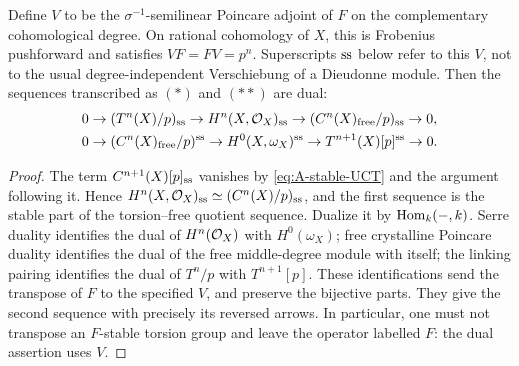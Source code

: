 \begin{proposition}\label{prop:A-star-dual}
 Define $V$ to be
the $\sigma^{-1}$-semilinear Poincare adjoint of $F$ on the
complementary cohomological degree.  On rational cohomology of $X$,
this is Frobenius pushforward and satisfies $VF=FV=p^n$.
Superscripts ${\ss}$ below refer to this $V$, not to the usual
degree-independent Verschiebung of a Dieudonne module.  Then the
sequences transcribed as $(*)$ and $(**)$ are dual:
\begin{align*}
0&\to(T^n(X)/p)_{\ss}\to H^n(X,\OO_X)_{\ss}
 \to(C^n(X)_{\rm free}/p)_{\ss}\to0,\\
0&\to(C^n(X)_{\rm free}/p)^{\ss}\to
 H^0(X,\omega_X)^{\ss}\to T^{n+1}(X)[p]^{\ss}\to0.
\end{align*}
\end{proposition}
\begin{proof}
The term $C^{n+1}(X)[p]_{\ss}$ vanishes by
\eqref{eq:A-stable-UCT} and the argument following it.  Hence
$H^n(X,\OO_X)_{\ss}\simeq(C^n(X)/p)_{\ss}$, and the first sequence
is the stable part of the torsion--free quotient sequence.
Dualize it by $\Hom_k(-,k)$.  Serre duality identifies the dual of
$H^n(\OO_X)$ with $H^0(\omega_X)$; free crystalline Poincare duality
identifies the dual of the free middle-degree module with itself;
the linking pairing identifies the dual of $T^n/p$ with
$T^{n+1}[p]$.  These identifications send the transpose of $F$ to
the specified $V$, and preserve the bijective parts.  They give the
second sequence with precisely its reversed arrows.  In particular,
one must not transpose an $F$-stable torsion group and leave the
operator labelled $F$: the dual assertion uses $V$.
\end{proof}

